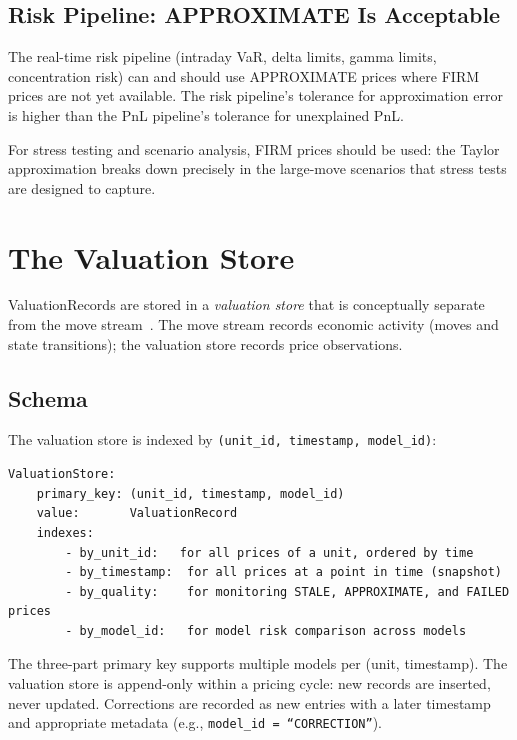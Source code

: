 \documentclass[11pt,a4paper]{article}
\begin{document}
\subsection{Risk Pipeline: APPROXIMATE Is Acceptable}

The real-time risk pipeline (intraday VaR, delta limits, gamma limits, concentration risk) can and should use APPROXIMATE prices where FIRM prices are not yet available.  The risk pipeline's tolerance for approximation error is higher than the PnL pipeline's tolerance for unexplained PnL.

For stress testing and scenario analysis, FIRM prices should be used: the Taylor approximation breaks down precisely in the large-move scenarios that stress tests are designed to capture.

\clearpage
\section{The Valuation Store}
\label{sec:valuation-store}

ValuationRecords are stored in a \emph{valuation store} that is conceptually separate from the move stream~\cite[\S8]{ledger}.  The move stream records economic activity (moves and state transitions); the valuation store records price observations.

\subsection{Schema}

The valuation store is indexed by \texttt{(unit\_id, timestamp, model\_id)}:

\begin{lstlisting}
ValuationStore:
    primary_key: (unit_id, timestamp, model_id)
    value:       ValuationRecord
    indexes:
        - by_unit_id:   for all prices of a unit, ordered by time
        - by_timestamp:  for all prices at a point in time (snapshot)
        - by_quality:    for monitoring STALE, APPROXIMATE, and FAILED prices
        - by_model_id:   for model risk comparison across models
\end{lstlisting}

\noindent The three-part primary key supports multiple models per (unit, timestamp).  The valuation store is append-only within a pricing cycle: new records are inserted, never updated.  Corrections are recorded as new entries with a later timestamp and appropriate metadata (e.g., \texttt{model\_id = ``CORRECTION''}).
\end{document}
